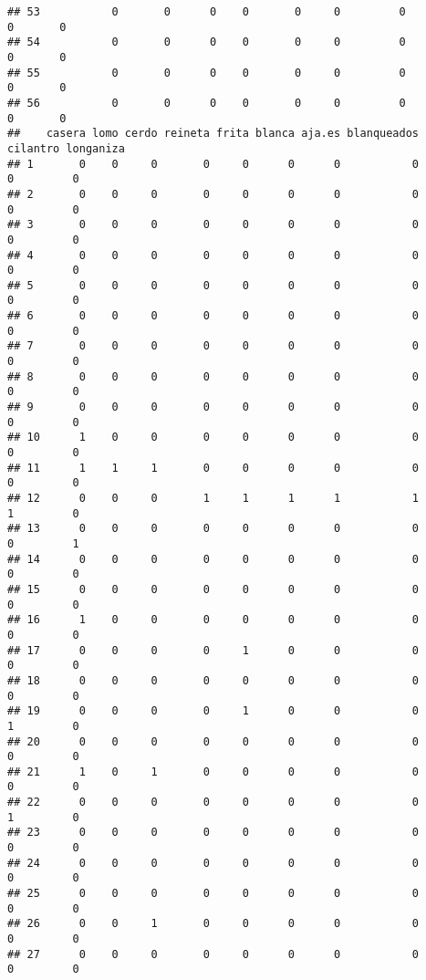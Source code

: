 \documentclass[
]{article}
\begin{document}
\begin{verbatim}
## 53           0       0      0    0       0     0         0          0       0
## 54           0       0      0    0       0     0         0          0       0
## 55           0       0      0    0       0     0         0          0       0
## 56           0       0      0    0       0     0         0          0       0
##    casera lomo cerdo reineta frita blanca aja.es blanqueados cilantro longaniza
## 1       0    0     0       0     0      0      0           0        0         0
## 2       0    0     0       0     0      0      0           0        0         0
## 3       0    0     0       0     0      0      0           0        0         0
## 4       0    0     0       0     0      0      0           0        0         0
## 5       0    0     0       0     0      0      0           0        0         0
## 6       0    0     0       0     0      0      0           0        0         0
## 7       0    0     0       0     0      0      0           0        0         0
## 8       0    0     0       0     0      0      0           0        0         0
## 9       0    0     0       0     0      0      0           0        0         0
## 10      1    0     0       0     0      0      0           0        0         0
## 11      1    1     1       0     0      0      0           0        0         0
## 12      0    0     0       1     1      1      1           1        1         0
## 13      0    0     0       0     0      0      0           0        0         1
## 14      0    0     0       0     0      0      0           0        0         0
## 15      0    0     0       0     0      0      0           0        0         0
## 16      1    0     0       0     0      0      0           0        0         0
## 17      0    0     0       0     1      0      0           0        0         0
## 18      0    0     0       0     0      0      0           0        0         0
## 19      0    0     0       0     1      0      0           0        1         0
## 20      0    0     0       0     0      0      0           0        0         0
## 21      1    0     1       0     0      0      0           0        0         0
## 22      0    0     0       0     0      0      0           0        1         0
## 23      0    0     0       0     0      0      0           0        0         0
## 24      0    0     0       0     0      0      0           0        0         0
## 25      0    0     0       0     0      0      0           0        0         0
## 26      0    0     1       0     0      0      0           0        0         0
## 27      0    0     0       0     0      0      0           0        0         0

\end{verbatim}
\end{document}
